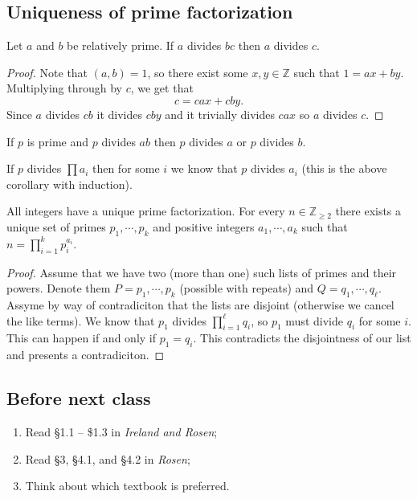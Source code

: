 \subsection*{Uniqueness of prime factorization}

\begin{lemma}
Let $a$ and $b$ be relatively prime. If $a$ divides $bc$ then $a$ divides $c$.
\end{lemma}

\begin{proof}
Note that $(a,b) = 1$, so there exist some $x,y \in \mathbb{Z}$ such that $1 = ax + by$. Multiplying through by $c$, we get that 
\[ c = cax + cby. \]
Since $a$ divides $cb$ it divides $cby$ and it trivially divides $cax$ so $a$ divides $c$.
\end{proof}

\begin{corollary}
If $p$ is prime and $p$ divides $ab$ then $p$ divides $a$ or $p$ divides $b$.
\end{corollary}

\begin{corollary}
If $p$ divides $\prod a_i$ then for some $i$ we know that $p$ divides $a_i$ (this is the above corollary with induction).
\end{corollary}

\begin{theorem}
All integers have a unique prime factorization. For every $n \in \mathbb{Z}_{\geq 2}$ there exists a unique set of primes $p_1, \cdots, p_k$ and positive integers $a_1 ,\cdots, a_k$ such that $n = \prod_{i=1}^k p_i^{a_i}$.
\end{theorem}

\begin{proof}
Assume that we have two (more than one) such lists of primes and their powers. Denote them $P = p_1, \cdots, p_k$ (possible with repeats) and $Q = q_1, \cdots, q_\ell$. Assyme by way of contradiciton that the lists are disjoint (otherwise we cancel the like terms). We know that $p_1$ divides $\prod_{i=1}^\ell q_i$, so $p_1$ must divide $q_i$ for some $i$. This can happen if and only if $p_1 = q_i$. This contradicts the disjointness of our list and presents a contradiciton.
\end{proof}

\subsection{Before next class}

\begin{enumerate}
\item Read \S1.1 -- \$1.3 in \emph{Ireland and Rosen};
\item Read \S3, \S4.1, and \S4.2 in \emph{Rosen};
\item Think about which textbook is preferred.
\end{enumerate}